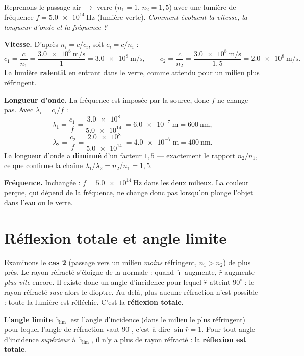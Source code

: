 \documentclass[11pt,a4paper]{article}
\newcommand{\angi}{\hat{\imath}}     %
\newcommand{\angr}{\hat{r}}          %
\begin{document}
\begin{exemple}
Reprenons le passage air $\to$ verre ($n_1=1$, $n_2=1{,}5$) avec une lumière de fréquence
$f = \SI{5.0e14}{\hertz}$ (lumière verte). \emph{Comment évoluent la vitesse, la longueur d'onde et
la fréquence ?}

\smallskip
\textbf{Vitesse.} D'après $n_i = c/c_i$, soit $c_i = c/n_i$ :
\[ c_1 = \frac{c}{n_1} = \frac{\SI{3.0e8}{\metre\per\second}}{1} = \SI{3.0e8}{\metre\per\second},
   \qquad
   c_2 = \frac{c}{n_2} = \frac{\SI{3.0e8}{\metre\per\second}}{1{,}5} = \SI{2.0e8}{\metre\per\second}. \]
La lumière \textbf{ralentit} en entrant dans le verre, comme attendu pour un milieu plus réfringent.

\smallskip
\textbf{Longueur d'onde.} La fréquence est imposée par la source, donc $f$ ne change pas. Avec
$\lambda_i = c_i/f$ :
\[ \lambda_1 = \frac{c_1}{f} = \frac{\SI{3.0e8}{}}{\SI{5.0e14}{}} = \SI{6.0e-7}{\metre} = \SI{600}{\nano\metre}, \]
\[ \lambda_2 = \frac{c_2}{f} = \frac{\SI{2.0e8}{}}{\SI{5.0e14}{}} = \SI{4.0e-7}{\metre} = \SI{400}{\nano\metre}. \]
La longueur d'onde a \textbf{diminué} d'un facteur $1{,}5$ — exactement le rapport $n_2/n_1$,
ce que confirme la chaîne $\lambda_1/\lambda_2 = n_2/n_1 = 1{,}5$.

\smallskip
\textbf{Fréquence.} Inchangée : $f = \SI{5.0e14}{\hertz}$ dans les deux milieux. La couleur perçue,
qui dépend de la fréquence, ne change donc pas lorsqu'on plonge l'objet dans l'eau ou le verre.
\end{exemple}

\section{Réflexion totale et angle limite}
Examinons le \textbf{cas 2} (passage vers un milieu \emph{moins} réfringent, $n_1 > n_2$) de plus près.
Le rayon réfracté s'éloigne de la normale : quand $\angi$ augmente, $\angr$ augmente \emph{plus vite}
encore. Il existe donc un angle d'incidence pour lequel $\angr$ atteint $90^\circ$ : le rayon réfracté
\emph{rase} alors le dioptre. Au-delà, plus aucune réfraction n'est possible : toute la lumière est
réfléchie. C'est la \textbf{réflexion totale}.

\begin{definition}
L'\textbf{angle limite} $\angi_{\text{lim}}$ est l'angle d'incidence (dans le milieu le plus réfringent)
pour lequel l'angle de réfraction vaut $90^\circ$, c'est-à-dire $\sin\angr = 1$. Pour tout angle
d'incidence \emph{supérieur} à $\angi_{\text{lim}}$, il n'y a plus de rayon réfracté : la
\textbf{réflexion est totale}.
\end{definition}
\end{document}
